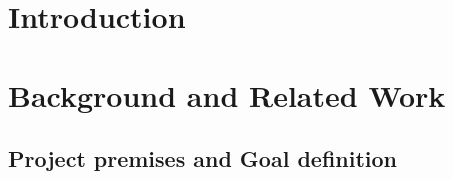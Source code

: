 \documentclass[12pt,twoside]{article}
\date{September 2018}
\begin{document}






\clearpage{\pagestyle{empty}\cleardoublepage}

\begin{abstract}
\normalsize


\end{abstract}
\clearpage
\clearpage

\renewcommand{\abstractname}{Acknowledgements}
\begin{abstract}



\end{abstract}
\clearpage


\tableofcontents 

\clearpage{\pagestyle{empty}\cleardoublepage}
\setcounter{page}{1}
\fancyhead[LE,RO]{\slshape \rightmark}
\fancyhead[LO,RE]{\slshape \leftmark}


\section{Introduction}



\clearpage



\section{Background and Related Work}
\subsection{Project premises and Goal definition}

\end{document}
